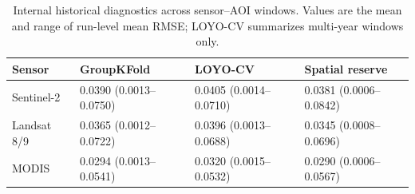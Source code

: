 \begin{table}[!htbp]\centering\footnotesize
\caption{Internal historical diagnostics across sensor--AOI windows. Values are the mean and range of run-level mean RMSE; LOYO-CV summarizes multi-year windows only.}\label{tab:internal}
\begin{tabularx}{.98\textwidth}{L{2.0cm}YYY}\toprule
Sensor & GroupKFold & LOYO-CV & Spatial reserve \\\midrule
Sentinel-2 & 0.0390 (0.0013--0.0750) & 0.0405 (0.0014--0.0710) & 0.0381 (0.0006--0.0842) \\
Landsat 8/9 & 0.0365 (0.0012--0.0722) & 0.0396 (0.0013--0.0688) & 0.0345 (0.0008--0.0696) \\
MODIS & 0.0294 (0.0013--0.0541) & 0.0320 (0.0015--0.0532) & 0.0290 (0.0006--0.0567) \\
\bottomrule\end{tabularx}
\end{table}
